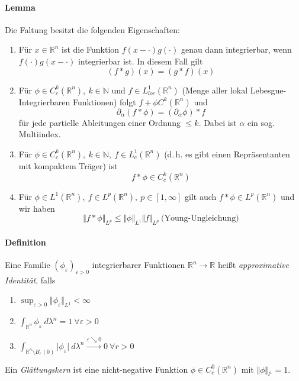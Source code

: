 \documentclass[12pt,a4paper,fleqn]{article}
\begin{document}
\paragraph{Lemma} Die Faltung besitzt die folgenden Eigenschaften:
\begin{enumerate}
\item Für $x \in \mathbb{R}^n$ ist die Funktion $f(x  - \cdot)g(\cdot)$ genau dann integrierbar, wenn $f(\cdot)g(x - \cdot)$ integrierbar ist. In diesem Fall gilt 
\begin{displaymath}
(f * g)(x) = (g*f)(x)
\end{displaymath}
\item Für $\phi \in C^k_c(\mathbb{R}^n),\ k \in \mathbb{N}$ und $f \in L^1_{loc}(\mathbb{R}^n)$ (Menge aller lokal Lebesgue-Integrierbaren Funktionen) folgt $f + \phi C^k(\mathbb{R}^n)$ und 
\begin{displaymath}
\partial_\alpha (f * \phi) = (\partial_\alpha \phi) * f
\end{displaymath}
für jede partielle Ableitungen einer Ordnung $\leq k$. Dabei ist $\alpha$ ein sog. Multiindex.
\item Für $\phi \in C^k_c (\mathbb{R}^n),\ k \in \mathbb{N},\ f \in L^1_c(\mathbb{R}^n)$ (d.\,h. es gibt einen Repräsentanten mit kompaktem Träger) ist
\begin{displaymath}
f * \phi \in C^k_c(\mathbb{R}^n)
\end{displaymath}
\item Für $\phi \in L^1(\mathbb{R}^n),\ f\in L^p(\mathbb{R}^n),\ p \in [1, \infty]$ gilt auch $f * \phi \in L^p(\mathbb{R}^n)$ und wir haben
\begin{displaymath}
\Vert f * \phi \Vert_{L^p} \leq \Vert \phi \Vert_{L^1} \Vert f \Vert_{L^p}\ \text{(Young-Ungleichung)}
\end{displaymath}
\end{enumerate}

\paragraph{Definition} Eine Familie $(\phi_\varepsilon)_{\varepsilon > 0}$ integrierbarer Funktionen $\mathbb{R}^n \rightarrow \mathbb{R}$ heißt \textit{approximative Identität}, falls 
\begin{enumerate}
\item $\sup_{\varepsilon > 0} \Vert \phi_\varepsilon \Vert _{L^1}  < \infty$
\item $\int_{\mathbb{R}^n} \phi_\varepsilon\ d\lambda^n = 1\ \forall\varepsilon>0$
\item$\int_{\mathbb{R}^n\setminus B_r(0)} \vert \phi_\varepsilon\vert\ d\lambda^n \xrightarrow{\varepsilon\searrow 0} 0\ \forall r > 0$ 
\end{enumerate}
Ein \textit{Glättungskern} ist eine nicht-negative Funktion $\phi \in C^0_c(\mathbb{R}^n)$ mit $\Vert \phi \Vert_{l^1} = 1$.
\end{document}
